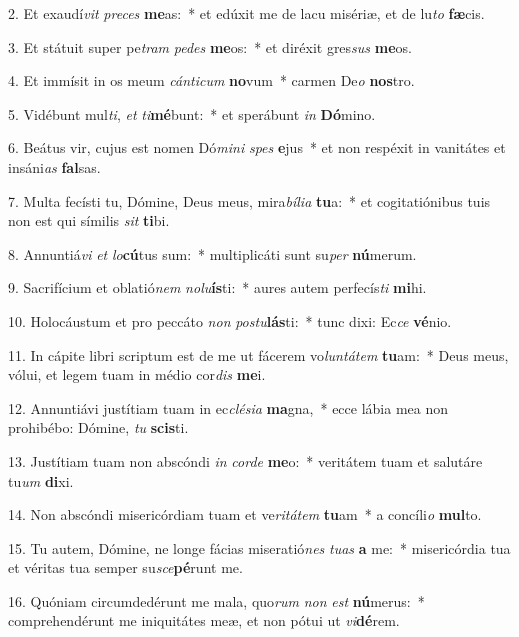 2. Et exaudí\textit{vit} \textit{pre}\textit{ces} \textbf{me}as:~*  et edúxit me de lacu misériæ, et de lu\textit{to} \textbf{fæ}cis.\

3. Et státuit super pe\textit{tram} \textit{pe}\textit{des} \textbf{me}os:~*  et diréxit gres\textit{sus} \textbf{me}os.\

4. Et immísit in os meum \textit{cán}\textit{ti}\textit{cum} \textbf{no}vum~*  carmen De\textit{o} \textbf{nos}tro.\

5. Vidébunt mul\textit{ti}, \textit{et} \textit{ti}\textbf{mé}bunt:~*  et sperábunt \textit{in} \textbf{Dó}mino.\

6. Beátus vir, cujus est nomen Dó\textit{mi}\textit{ni} \textit{spes} \textbf{e}jus~*  et non respéxit in vanitátes et insáni\textit{as} \textbf{fal}sas.\

7. Multa fecísti tu, Dómine, Deus meus, mira\textit{bí}\textit{li}\textit{a} \textbf{tu}a:~*  et cogitatiónibus tuis non est qui símilis \textit{sit} \textbf{ti}bi.\

8. Annuntiá\textit{vi} \textit{et} \textit{lo}\textbf{cú}tus sum:~*  multiplicáti sunt su\textit{per} \textbf{nú}merum.\

9. Sacrifícium et oblatió\textit{nem} \textit{no}\textit{lu}\textbf{ís}ti:~*  aures autem perfecís\textit{ti} \textbf{mi}hi.\

10. Holocáustum et pro peccáto \textit{non} \textit{pos}\textit{tu}\textbf{lás}ti:~*  tunc dixi: Ec\textit{ce} \textbf{vé}nio.\

11. In cápite libri scriptum est de me ut fácerem vo\textit{lun}\textit{tá}\textit{tem} \textbf{tu}am:~*  Deus meus, vólui, et legem tuam in médio cor\textit{dis} \textbf{me}i.\

12. Annuntiávi justítiam tuam in ec\textit{clé}\textit{si}\textit{a} \textbf{ma}gna,~*  ecce lábia mea non prohibébo: Dómine, \textit{tu} \textbf{scis}ti.\

13. Justítiam tuam non abscóndi \textit{in} \textit{cor}\textit{de} \textbf{me}o:~*  veritátem tuam et salutáre tu\textit{um} \textbf{di}xi.\

14. Non abscóndi misericórdiam tuam et ve\textit{ri}\textit{tá}\textit{tem} \textbf{tu}am~*  a concíli\textit{o} \textbf{mul}to.\

15. Tu autem, Dómine, ne longe fácias miseratió\textit{nes} \textit{tu}\textit{as} \textbf{a} me:~*  misericórdia tua et véritas tua semper su\textit{sce}\textbf{pé}runt me.\

16. Quóniam circumdedérunt me mala, quo\textit{rum} \textit{non} \textit{est} \textbf{nú}merus:~*  comprehendérunt me iniquitátes meæ, et non pótui ut \textit{vi}\textbf{dé}rem.\

